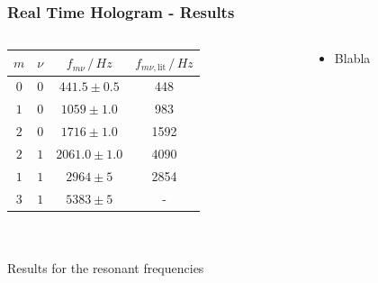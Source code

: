 \documentclass{beamer}
\begin{document}
\begin{frame}
	\frametitle{Real Time Hologram - Results}
	\begin{columns}
		\begin{column}{0.6\textwidth}
			\begin{table}
				\centering
				\begin{tabular}{c|c|c|c}
					$m$ & $\nu$ 		& $f_{m\nu}\,/\,\si{Hz}$ 	& $f_{m\nu, \text{lit}}\,/\,\si{Hz}$\\ \hline\hline
					$0$&$0$	& $441.5\pm0.5$					& 448	\\ \hline
					$1$&$0$	& $1059\pm1.0$				& 983	\\ \hline
					$2$&$0$	& $1716\pm1.0$				& 1592	\\ \hline
					$2$&$1$	& $2061.0\pm1.0$				& 4090	\\ \hline
					$1$&$1$	& $2964\pm5$				& 2854 \\ \hline
					$3$&$1$	& $5383\pm5$				&-
				\end{tabular}\\\scriptsize\ \\\small
				{Results for the resonant frequencies\footnotemark}
			\end{table}		
		\end{column}
		\pause
		\begin{column}{0.5\textwidth}
			\begin{itemize}
				\item Blabla
			\end{itemize}
		\end{column}
	\end{columns}
\end{frame}
\end{document}
